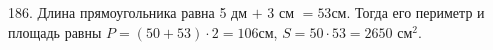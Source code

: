 186. Длина прямоугольника равна 5 дм $+$ 3 см $=53$см. Тогда его периметр и площадь равны $P=(50+53)\cdot2=106$см, $S=50\cdot53=2650\text{ см}^2.$\\
